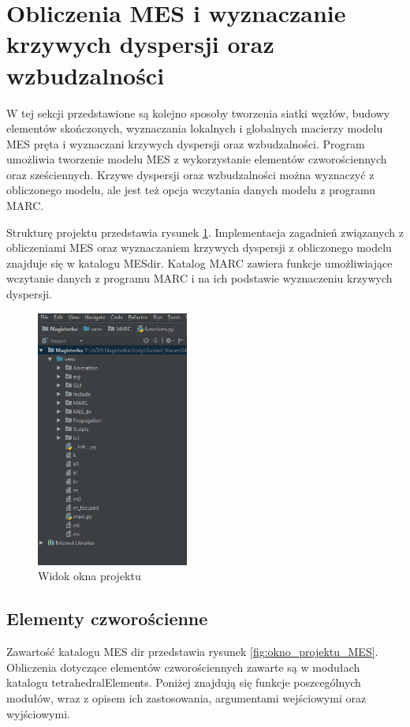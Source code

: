 \section{Obliczenia MES i wyznaczanie krzywych dyspersji oraz wzbudzalności}
\label{cha:obliczenia_mes}

W tej sekcji przedstawione są kolejno sposoby tworzenia siatki węzłów, budowy elementów skończonych, wyznaczania lokalnych i globalnych macierzy modelu MES pręta i wyznaczani krzywych dyspersji oraz wzbudzalności. Program umożliwia tworzenie modelu MES z wykorzystanie elementów czworościennych oraz sześciennych. Krzywe dyspersji oraz wzbudzalności można wyznaczyć z obliczonego modelu, ale jest też opcja wczytania danych modelu z programu MARC.

Strukturę projektu przedstawia rysunek \ref{fig:okno_projektu}. Implementacja zagadnień związanych z obliczeniami MES oraz wyznaczaniem krzywych dyspersji z obliczonego modelu znajduje się w katalogu MES\textunderscore dir. Katalog MARC zawiera funkcje umożliwiające wczytanie danych z programu MARC i na ich podstawie wyznaczeniu krzywych dyspersji.

\begin{figure}[h]
\centering
\includegraphics[width=5cm]{Zdjecia/5/okno_projektu}
\caption{Widok okna projektu}
\label{fig:okno_projektu}
\end{figure}

\subsection{Elementy czworościenne}
\label{cha:elementy czworościenne}

Zawartość katalogu MES dir przedstawia rysunek \ref{fig:okno_projektu_MES}. Obliczenia dotyczące elementów czworościennych zawarte są w modułach katalogu tetrahedralElements. Poniżej znajdują się funkcje poszcególnych modułów, wraz z opisem ich zastosowania, argumentami wejściowymi oraz wyjściowymi.

